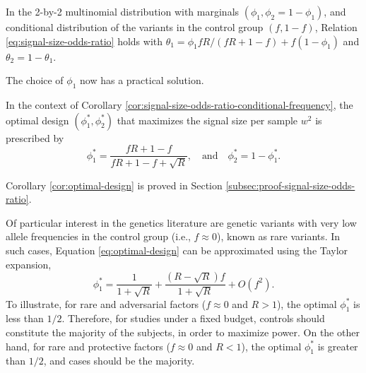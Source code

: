 \begin{corollary} \label{cor:signal-size-odds-ratio-conditional-frequency}
In the 2-by-2 multinomial distribution with marginals $(\phi_1, \phi_2 = 1-\phi_1)$, and conditional distribution of the variants in the control group $(f, 1-f)$,
Relation \eqref{eq:signal-size-odds-ratio} holds with $\theta_1 = {\phi_1fR}/{(fR+1-f)} + f(1-\phi_1)$ and $\theta_2 = 1-\theta_1$.
\end{corollary} 

The choice of $\phi_1$ now has a practical solution.

\begin{corollary} \label{cor:optimal-design}
In the context of Corollary \ref{cor:signal-size-odds-ratio-conditional-frequency},
the optimal design $(\phi^*_1, \phi^*_2)$ that maximizes the signal size per sample $w^2$ is prescribed by
\begin{equation} \label{eq:optimal-design}
    \phi_1^* = \frac{fR+1-f}{fR+1-f+\sqrt{R}}, \quad\text{and}\quad 
    \phi_2^* = 1-\phi_1^*.
\end{equation}
\end{corollary} 

Corollary \ref{cor:optimal-design} is proved in Section \ref{subsec:proof-signal-size-odds-ratio}. 

Of particular interest in the genetics literature are genetic variants with very low allele frequencies in the control group (i.e., $f\approx 0$), known as rare variants.
In such cases, Equation \eqref{eq:optimal-design} can be approximated using the Taylor expansion,
\begin{equation} \label{eq:optimal-design-approx}
    \phi_1^* = \frac{1}{1 + \sqrt{R}} + \frac{(R-\sqrt{R})f}{1+\sqrt{R}} + O(f^2).
\end{equation}
To illustrate, for rare and adversarial factors ($f\approx0$ and $R>1$), the optimal $\phi_1^*$ is less than $1/2$.
Therefore, for studies under a fixed budget, controls should constitute the majority of the subjects, in order to maximize power.
On the other hand, for rare and protective factors ($f\approx0$ and $R<1$), the optimal $\phi_1^*$ is greater than $1/2$, and cases should be the majority.
